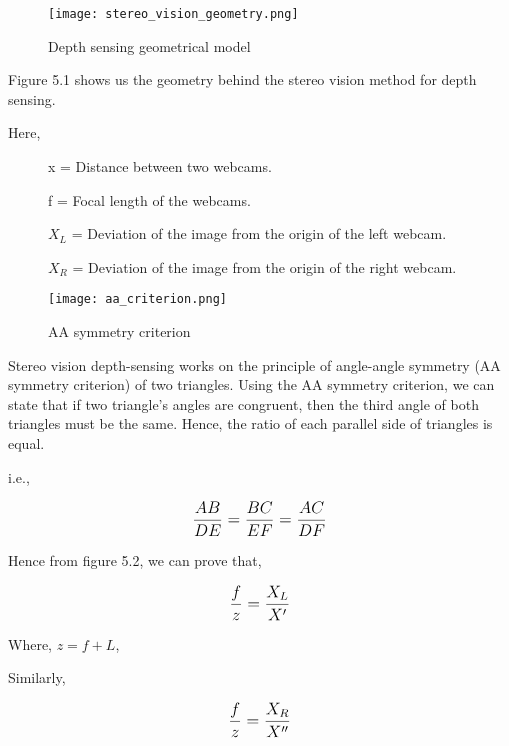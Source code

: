 \documentclass[../../hardware_design_intro/hardware_design_intro.tex]{subfiles}
\begin{document}
\FloatBarrier

\begin{figure}[ht]
    \centering
    \texttt{[image: stereo\_vision\_geometry.png]}
    \caption{Depth sensing geometrical model}
\end{figure}

\FloatBarrier

Figure 5.1 shows us the geometry behind the stereo vision method for depth sensing.

Here, 

\begin{description}
    \item[]x = Distance between two webcams. 
    \item[]f = Focal length of the webcams.
    \item[]\(X_{L}\) = Deviation of the image from the origin of the left webcam.
    \item[]\(X_{R}\) = Deviation of the image from the origin of the right webcam.  
\end{description}

\begin{figure}[ht]
    \centering
    \texttt{[image: aa\_criterion.png]}
    \caption{AA symmetry criterion}
\end{figure}

Stereo vision depth-sensing works on the principle of angle-angle symmetry (AA symmetry 
criterion) of two triangles. Using the AA symmetry criterion, we can state that if two 
triangle's angles are congruent, then the third angle of both triangles must be the 
same. Hence, the ratio of each parallel side of triangles is equal.

i.e.,

\begin{equation}
    \text{\large$ \frac{AB}{DE} = \frac{BC}{EF} = \frac{AC}{DF} $}
\end{equation}

Hence from figure 5.2, we can prove that,

\begin{equation}
    \text{\large$ \frac{f}{z} = \frac{X_{L}}{X'} $}
\end{equation}

Where, \(z = f + L \),

Similarly,

\begin{equation}
    \text{\large$ \frac{f}{z} = \frac{X_{R}}{X''} $}
\end{equation}
\end{document}
